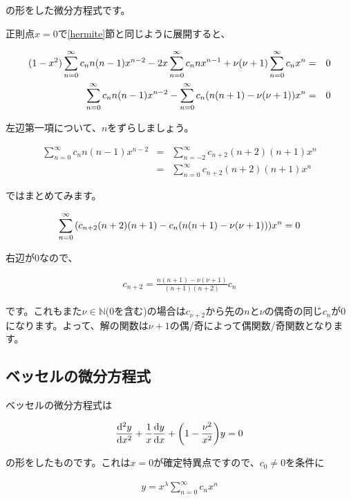 \noindent
の形をした微分方程式です。

正則点$x=0$で\ref{hermite}節と同じように展開すると、

\begin{eqnarray}
    (1-x^2)\sum_{n=0}^\infty c_n n(n-1)x^{n-2}-2x\sum_{n=0}^\infty c_n nx^{n-1}+\nu(\nu+1)\sum_{n=0}^\infty c_nx^n&=&0 \\
    \sum_{n=0}^\infty c_n n(n-1)x^{n-2}-\sum_{n=0}^\infty c_n\pqty{n(n+1)-\nu(\nu+1)}x^n&=&0
\end{eqnarray}

左辺第一項について、$n$をずらしましょう。

\begin{eqnarray}
    \sum_{n=0}^\infty c_n n(n-1)x^{n-2}&=&\sum_{n=-2}^\infty c_{n+2} (n+2)(n+1)x^n \\
    &=&\sum_{n=0}^\infty c_{n+2} (n+2)(n+1)x^n
\end{eqnarray}

ではまとめてみます。

\begin{eqnarray}
    \sum_{n=0}^\infty \pqty{c_{n+2}(n+2)(n+1)-c_n(n(n+1)-\nu(\nu+1))}x^n=0
\end{eqnarray}

右辺が0なので、

\begin{eqnarray}
    c_{n+2}=\frac{n(n+1)-\nu(\nu+1)}{(n+1)(n+2)}c_n
\end{eqnarray}

\noindent
です。これもまた$\nu\in\mathbb{N}$(0を含む)の場合は$c_{\nu+2}$から先の$n$と$\nu$の偶奇の同じ$c_n$が0になります。よって、解の関数は$\nu+1$の偶/奇によって偶関数/奇関数となります。








\subsection{ベッセルの微分方程式}
\label{vessel}
ベッセルの微分方程式は

\begin{eqnarray}
    \frac{\dd^2 y}{\dd x^2}+\frac{1}{x}\frac{\dd y}{\dd x}+\pqty{1-\frac{\nu^2}{x^2}}y=0
\end{eqnarray}

\noindent
の形をしたものです。これは$x=0$が確定特異点ですので、$c_0\neq0$を条件に

\begin{eqnarray}
y=x^\lambda\sum_{n=0}^\infty c_nx^n
\end{eqnarray}

